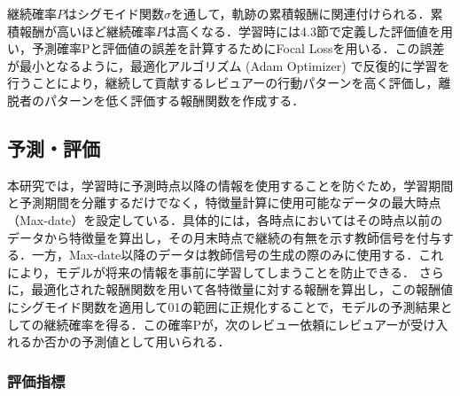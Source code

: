 \documentclass[submit,techrep,noauthor]{ipsj}
\begin{document}
継続確率$P$はシグモイド関数$\sigma$を通して，軌跡の累積報酬に関連付けられる．累積報酬が高いほど継続確率$P$は高くなる．学習時には4.3節で定義した評価値を用い，予測確率Pと評価値の誤差を計算するためにFocal Lossを用いる．この誤差が最小となるように，最適化アルゴリズム (Adam Optimizer) で反復的に学習を行うことにより，継続して貢献するレビュアーの行動パターンを高く評価し，離脱者のパターンを低く評価する報酬関数を作成する．


\subsection{予測・評価}

本研究では，学習時に予測時点以降の情報を使用することを防ぐため，学習期間と予測期間を分離するだけでなく，特徴量計算に使用可能なデータの最大時点（Max-date）を設定している．具体的には，各時点においてはその時点以前のデータから特徴量を算出し，その月末時点で継続の有無を示す教師信号を付与する．一方，Max-date以降のデータは教師信号の生成の際のみに使用する．これにより，モデルが将来の情報を事前に学習してしまうことを防止できる．
さらに，最適化された報酬関数を用いて各特徴量に対する報酬を算出し，この報酬値にシグモイド関数を適用して01の範囲に正規化することで，モデルの予測結果としての継続確率を得る．この確率Pが，次のレビュー依頼にレビュアーが受け入れるか否かの予測値として用いられる．



\subsubsection{評価指標}
\end{document}
